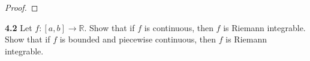 \documentclass[12pt]{article}
\begin{document}
\begin{proof}
		
%		
%		
%		
%		
	\end{proof}



\hspace{-4 ex}\textbf{4.2} Let $f\colon[a,b]\to\mathbb{R}$. Show that if $f$ is continuous, then $f$ is Riemann integrable. Show that if $f$ is bounded and piecewise continuous, then $f$ is Riemann integrable. \bigbreak
\end{document}
